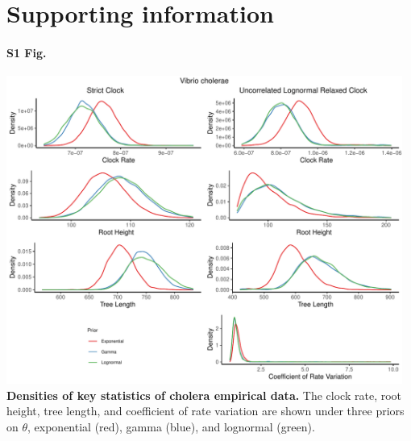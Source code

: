 \documentclass[10pt,letterpaper]{article}
\begin{document}
\section*{Supporting information}

\paragraph*{S1 Fig.}
\label{S1_Fig}
	\begin{center}
		\includegraphics[width=13cm]{sandbox_figures/cholera_density_plot.pdf}\newline
		\textbf{Densities of key statistics of cholera empirical data.} The clock rate, root height, tree length, and coefficient of rate variation are shown under three priors on $\theta$, exponential (red), gamma (blue), and lognormal (green).
	\end{center}
\end{document}
